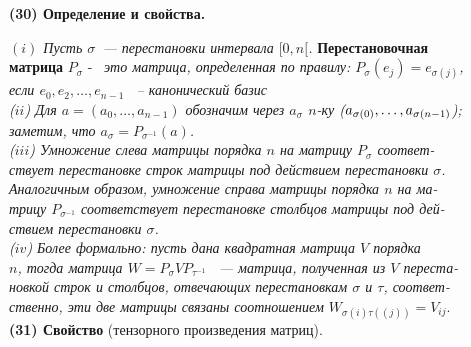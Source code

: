 \documentclass{mai_book}
\begin{document}
{\noindent \textbf{(30) Определение и свойства.}

\medskip
\indent\textit{ $(i)$  Пусть $\sigma$~--- перестановки интервала $[0, n[$.} \textbf{Перестановочная \\ матрица} $P_\sigma$ -~ \textit{это матрица, определенная по правилу: $P_\sigma(e_j) = e_{\sigma(j)}$, \\ если $e_0, e_2, \ldots , e_{n-1}$ ~-- канонический базис}\\
	\indent \textit{($ii$) Для $a = (a_0, \ldots, a_{n-1})$ обозначим через $a_\sigma$ $n$-ку ($a_{\sigma(0)}, \ldots ,\\ a_{\sigma(n-1)}$); заметим, что $a_\sigma = P_{\sigma^{-1}}(a)$.} \\
		\indent\textit{($iii$) Умножение слева матрицы порядка $n$ на матрицу  $P_\sigma$ соответ-\\ствует перестановке строк матрицы под действием перестановки $\sigma$.\\Аналогичным образом, умножение справа матрицы порядка $n$ на ма-\\трицу $P_{\sigma^{-1}}$ соответствует перестановке столбцов матрицы под дей-\\ствием перестановки $\sigma$.} \\
			\indent\textit{($iv$) Более формально: пусть дана квадратная матрица $V$ порядка \\ $n$, тогда матрица $W = P_\sigma V P_{\tau^{-1}}$ ~--- матрица, полученная из $V$ переста-\\новкой строк и столбцов, отвечающих перестановкам $\sigma$ и $\tau$, соответ-\\ственно, эти две матрицы связаны соотношением $W_{\sigma(i)\tau((j))} = V_{ij}$}. \\ 
			
				\noindent \textbf{(31) Свойство} (тензорного произведения матриц).
				
}
\end{document}
